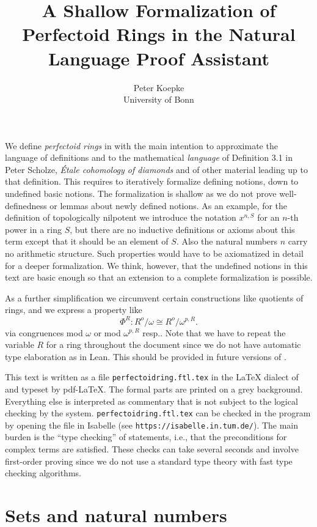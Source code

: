 \documentclass{article}
\title{A Shallow Formalization of Perfectoid Rings in the
\Naproche Natural Language Proof Assistant}
\author{Peter Koepke\\
University of Bonn}
\begin{document}
\maketitle

We define \textit{perfectoid rings} in \Naproche with the main intention to approximate
the language of definitions and
to the mathematical \textit{language} of Definition 3.1 in
Peter Scholze, \textit{Étale cohomology of diamonds} and of other material leading up
to that definition.
This requires to iteratively formalize
defining notions, down to undefined basic notions.
The formalization is shallow as we do not prove well-definedness or lemmas about
newly defined notions. As an example, for the definition of topologically nilpotent
we introduce the notation $x^{n,S}$ for an $n$-th power in a ring $S$, but there are
no inductive definitions or axioms about this term except that it should be an element
of $S$. Also the natural numbers $n$ carry no arithmetic structure.
Such properties would have to be axiomatized in detail for a deeper formalization.
We think, however, that the undefined notions in this text are basic enough so that an
extension to a complete formalization is possible.

As a further simplification we circumvent certain constructions like quotients of rings,
and we express a property like
\[ \Phi^{R} : R^o / \omega \cong R^o / \omega^{p,R}. \]
via congruences mod $\omega$ or mod $\omega^{p,R}$ resp.. Note that we
have to repeat the variable $R$ for a ring throughout the document since
we do not have automatic type elaboration as in Lean. This should be
provided in future versions of \Naproche.

This text is written as a file
\texttt{perfectoidring.ftl.tex}
in the \LaTeX{} dialect of \Naproche and
typeset by pdf-\LaTeX. The formal parts are printed on a grey background. Everything else
is interpreted as commentary that is not subject to the logical checking by the system.
\texttt{perfectoidring.ftl.tex}
can be checked in the \Naproche program by opening the file in Isabelle (see
\texttt{https://isabelle.in.tum.de/}).
The main burden is the ``type checking'' of statements, i.e., that the preconditions
for complex terms are satisfied. These checks can take several seconds and involve
first-order proving since we do not use a standard type theory with fast type checking
algorithms.


\section{Sets and natural numbers}
\end{document}
